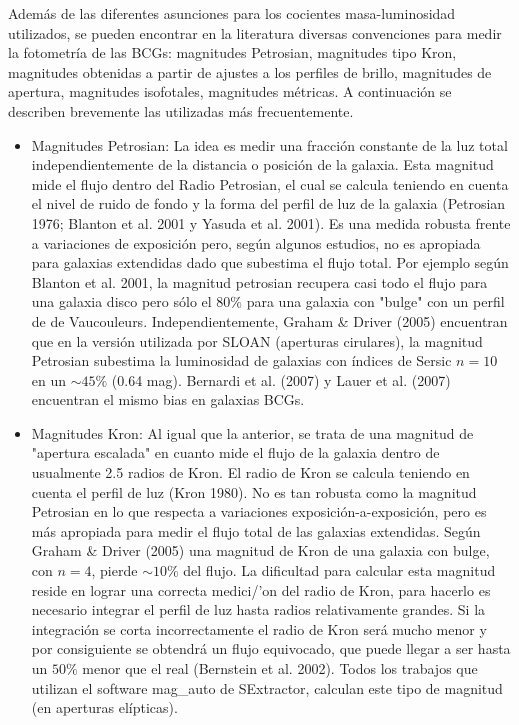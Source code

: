 Adem\'as de las diferentes asunciones para los cocientes masa-luminosidad utilizados, se pueden encontrar en la 
literatura diversas convenciones para medir la fotometr\'ia de las BCGs: magnitudes Petrosian, magnitudes tipo Kron, 
magnitudes obtenidas a partir de ajustes a los perfiles de brillo, magnitudes de apertura, magnitudes isofotales, 
magnitudes m\'etricas. A continuaci\'on se describen brevemente las utilizadas m\'as frecuentemente.

\begin{itemize}
\item Magnitudes Petrosian: La idea es medir una fracci\'on constante de la luz total independientemente de la distancia o posici\'on de la galaxia. Esta magnitud mide el flujo dentro del Radio Petrosian, el cual se calcula teniendo en cuenta el nivel de ruido de fondo y la forma del perfil de luz de la galaxia (Petrosian 1976; Blanton et al. 2001 y Yasuda et al. 2001). Es una medida robusta frente a variaciones de exposici\'on pero, seg\'un algunos estudios, no es apropiada para galaxias extendidas dado que subestima el flujo total. Por ejemplo seg\'un Blanton et al. 2001, la magnitud petrosian recupera casi todo el flujo para una galaxia disco pero s\'olo el $80\%$ para una galaxia con "bulge" con un perfil de de Vaucouleurs. Independientemente, Graham \& Driver (2005) encuentran que en la versi\'on utilizada por SLOAN (aperturas cirulares), la magnitud Petrosian subestima la luminosidad de galaxias con \'indices de Sersic $n=10$ en un $\sim45\%$ (0.64 mag). Bernardi et al. (2007) y Lauer et al. (2007) encuentran el mismo bias en galaxias BCGs.

\item Magnitudes Kron: Al igual que la anterior, se trata de una magnitud de "apertura escalada" en cuanto mide el flujo de la galaxia dentro de usualmente 2.5 radios de Kron. El radio de Kron se calcula teniendo en cuenta el perfil de luz (Kron 1980). No es tan robusta como la magnitud Petrosian en lo que respecta a variaciones exposici\'on-a-exposici\'on, pero es m\'as apropiada para medir el flujo total de las galaxias extendidas. Seg\'un Graham \& Driver (2005) una magnitud de Kron de una galaxia con bulge, con $n=4$, pierde $\sim 10\%$ del flujo. La dificultad para calcular esta magnitud reside en lograr una correcta medici/'on del radio de Kron, para hacerlo es necesario integrar el perfil de luz hasta radios relativamente grandes. Si la integraci\'on se corta incorrectamente el radio de Kron ser\'a mucho menor y por consiguiente se obtendr\'a un flujo equivocado, que puede llegar a ser hasta un $50\%$ menor que el real (Bernstein et al. 2002). Todos los trabajos que utilizan el software  mag\_auto de  SExtractor, calculan este tipo de magnitud (en aperturas el\'ipticas).


\end{itemize}
